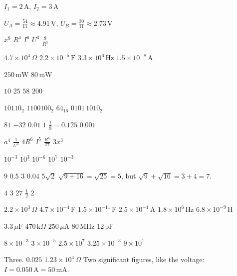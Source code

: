 
\begin{facit}

 $I_1 = 2\,\text{A}$, $I_2 = 3\,\text{A}$

 $U_A = \frac{54}{11} \approx 4.91\,\text{V}$, $U_B = \frac{30}{11} \approx
2.73\,\text{V}$

  $x^8$  $R^4$  $I^6$  $U^3$  $\frac{8}{R^3}$

  $4.7 \times 10^4\,\Omega$  $2.2 \times 10^{-5}\,\text{F}$
 $3.3 \times 10^6\,\text{Hz}$  $1.5 \times 10^{-8}\,\text{A}$

  $250\,\text{mW}$  $80\,\text{mW}$

  $10$  $25$  $58$  $200$

  $10110_2$  $1100100_2$  $\mathrm{64}_{16}$  $0101\,1010_2$

  $81$  $-32$  $0.01$  $1$  $\frac{1}{8} = 0.125$
 $0.001$

  $a^4$  $\frac{1}{U^3}$  $4R^6$  $I^5$  $\frac{R^6}{27}$
 $3x^3$

  $10^{-3}$  $10^3$  $10^{-6}$  $10^7$  $10^{-3}$

  $9$  $0.5$  $3$  $0.04$  $5\sqrt{2}$
 $\sqrt{9 + 16} = \sqrt{25} = 5$, but $\sqrt{9} + \sqrt{16} = 3 + 4 = 7$.

  $4$  $3$  $27$  $\frac{1}{2}$  $2$

  $2.2 \times 10^3\,\Omega$  $4.7 \times 10^{-4}\,\text{F}$
 $1.5 \times 10^{-11}\,\text{F}$  $2.5 \times 10^{-1}\,\text{A}$
 $1.8 \times 10^6\,\text{Hz}$  $6.8 \times 10^{-9}\,\text{H}$

  $3.3\,\mu\text{F}$  $470\,\text{k}\Omega$  $250\,\mu\text{A}$
 $80\,\text{MHz}$  $12\,\text{pF}$

  $8 \times 10^{-3}$  $3 \times 10^{-5}$  $2.5 \times 10^7$
 $3.25 \times 10^{-3}$  $9 \times 10^1$

  Three.  $0.025$  $1.23 \times 10^4\,\Omega$
 Two significant figures, like the voltage: $I = 0.050\,\text{A} = 50\,\text{mA}$.


\end{facit}
